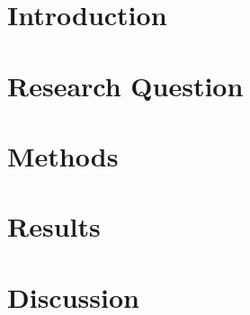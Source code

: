 \documentclass[a4paper,12pt]{article}
\title{}
\author{\textbf{Kimmo Puputti}\\kimmo.puputti@futurice.com\\\url{http://kpuputti.fi/}}
\begin{document}
\maketitle
\clearpage

\section{Introduction}



\section{Research Question}



\section{Methods}



\section{Results}



\section{Discussion}
\end{document}
